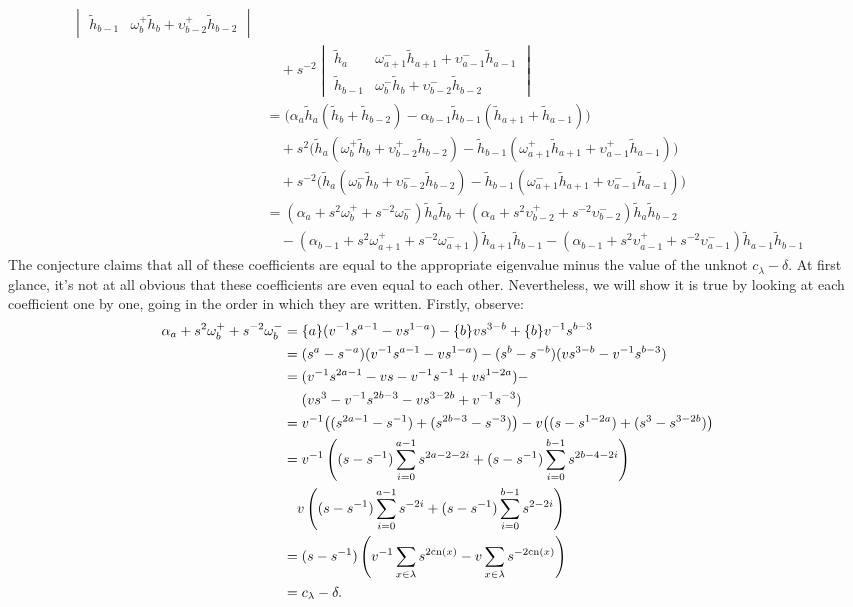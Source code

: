 \begin{align*}
\begin{vmatrix}
\tilde{h}_{b-1} & \omega_{b}^+ \tilde{h}_{b} + \upsilon^+_{b-2} \tilde{h}_{b-2}
\end{vmatrix} \\
& \quad + s^{-2}
\begin{vmatrix}
\tilde{h}_a & \omega_{a+1}^- \tilde{h}_{a+1} + \upsilon^-_{a-1} \tilde{h}_{a-1} \\
\tilde{h}_{b-1} & \omega_{b}^- \tilde{h}_{b} + \upsilon^-_{b-2} \tilde{h}_{b-2}
\end{vmatrix} \\
&= \big( \alpha_a \tilde{h}_a (\tilde{h}_{b} + \tilde{h}_{b-2}) - \alpha_{b-1} \tilde{h}_{b-1} (\tilde{h}_{a+1} + \tilde{h}_{a-1}) \big) \\
& \quad + s^2 \big( \tilde{h}_a (\omega_{b}^+ \tilde{h}_{b} + \upsilon^+_{b-2} \tilde{h}_{b-2}) - \tilde{h}_{b-1}( \omega_{a+1}^+\tilde{h}_{a+1} + \upsilon^+_{a-1} \tilde{h}_{a-1}) \big) \\
& \quad + s^{-2} \big( \tilde{h}_a (\omega_{b}^- \tilde{h}_{b} + \upsilon^-_{b-2} \tilde{h}_{b-2}) - \tilde{h}_{b-1} (\omega_{a+1}^- \tilde{h}_{a+1} + \upsilon^-_{a-1} \tilde{h}_{a-1}) \big) \\
&= (\alpha_a + s^2 \omega_b^+ + s^{-2} \omega_b^-) \tilde{h}_a \tilde{h}_b + (\alpha_a + s^2 \upsilon_{b-2}^+ + s^{-2} \upsilon_{b-2}^-) \tilde{h}_a \tilde{h}_{b-2} \\
&\quad - (\alpha_{b-1} + s^{2} \omega_{a+1}^+ + s^{-2} \omega_{a+1}^-) \tilde{h}_{a+1} \tilde{h}_{b-1} - (\alpha_{b-1} + s^2 \upsilon_{a-1}^+ + s^{-2} \upsilon_{a-1}^-) \tilde{h}_{a-1} \tilde{h}_{b-1} 
\end{align*}
The conjecture claims that all of these coefficients are equal to the appropriate eigenvalue minus the value of the unknot $c_\lambda - \delta$. At first glance, it's not at all obvious that these coefficients are even equal to each other. Nevertheless, we will show it is true by looking at each coefficient one by one, going in the order in which they are written. Firstly, observe:
\begin{align*}
\alpha_a + s^2 \omega_b^+ + s^{-2}\omega_b^- &= \{a\} (v^{-1}s^{a-1} - v s^{1-a} ) - \{b\}vs^{3-b} + \{b\}v^{-1}s^{b-3} \\
&= (s^a - s^{-a}) (v^{-1}s^{a-1} - v s^{1-a} ) -  (s^b - s^{-b})(vs^{3-b} - v^{-1}s^{b-3}) \\
&= (v^{-1} s^{2a-1} - vs - v^{-1}s^{-1} + vs^{1-2a}) - \\
& \quad\,\, (vs^3 - v^{-1}s^{2b-3} - vs^{3-2b} + v^{-1}s^{-3}) \\
&= v^{-1} \big( (s^{2a-1} - s^{-1}) + (s^{2b-3} - s^{-3}) \big) - v \big( ( s - s^{1-2a}) + (s^3 - s^{3-2b}) \big) \\
&= v^{-1} \left( (s-s^{-1}) \sum_{i=0}^{a-1} s^{2a - 2 - 2i} + (s-s^{-1}) \sum_{i=0}^{b-1} s^{2b-4-2i} \right) \\
&\quad v \left( (s-s^{-1}) \sum_{i=0}^{a-1} s^{-2i} + (s-s^{-1}) \sum_{i=0}^{b-1} s^{2-2i} \right) \\
&= (s-s^{-1}) \left( v^{-1} \sum_{x \in \lambda} s^{2 \mathrm{cn}(x)} - v \sum_{x \in \lambda} s^{-2\mathrm{cn}(x)} \right) \\
&= c_\lambda - \delta.
\end{align*}
